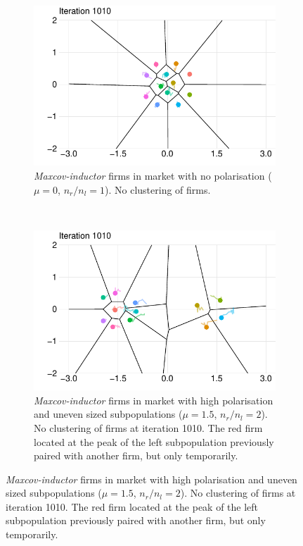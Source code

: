 \documentclass[preprint, 12pt]{elsarticle}
\begin{document}
\begin{figure}[hb!]
	\begin{subfigure}[t]{0.485\textwidth}
		\includegraphics[width=\textwidth]{Graphics/figm_cmiu.pdf}
		\caption{\emph{Maxcov-inductor} firms in market with no polarisation ($\mu=0$, $n_r/n_l = 1$). No clustering of firms.}
		\label{fig:twelve_uni_mi}
	\end{subfigure}
	~
	\begin{subfigure}[t]{0.485\textwidth}
		\includegraphics[width=\textwidth]{Graphics/figm_cmib.pdf}
		\caption{\emph{Maxcov-inductor} firms in market with high polarisation and uneven sized subpopulations ($\mu=1.5$, $n_r/n_l = 2$). No clustering of firms at iteration 1010. The red firm located at the peak of the left subpopulation previously paired with another firm, but only temporarily.}
		\label{fig:twelve_bi_mi}
	\end{subfigure}
	
	\label{fig:twelve}
\end{figure}
\end{document}
